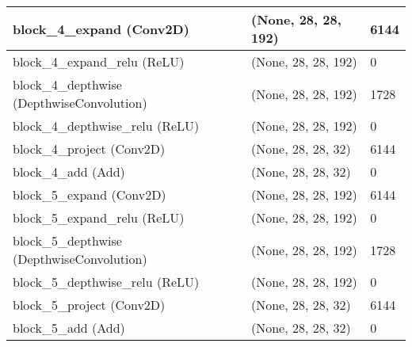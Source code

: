 \documentclass{article}
\begin{document}
\begin{center}
\begin{longtable}[h]{ p{}  p{}  p{}}
block\_4\_expand (Conv2D)                          & (None, 28, 28, 192)  & 6144     \\ \hline
block\_4\_expand\_relu (ReLU)                      & (None, 28, 28, 192)  & 0        \\ \hline
block\_4\_depthwise (DepthwiseConvolution)         & (None, 28, 28, 192)  & 1728     \\ \hline
block\_4\_depthwise\_relu (ReLU)                   & (None, 28, 28, 192)  & 0        \\ \hline
block\_4\_project (Conv2D)                         & (None, 28, 28, 32)   & 6144     \\ \hline
block\_4\_add (Add)                                & (None, 28, 28, 32)   & 0        \\ \hline
block\_5\_expand (Conv2D)                          & (None, 28, 28, 192)  & 6144     \\ \hline
block\_5\_expand\_relu (ReLU)                      & (None, 28, 28, 192)  & 0        \\ \hline
block\_5\_depthwise (DepthwiseConvolution)         & (None, 28, 28, 192)  & 1728     \\ \hline
block\_5\_depthwise\_relu (ReLU)                   & (None, 28, 28, 192)  & 0        \\ \hline
block\_5\_project (Conv2D)                         & (None, 28, 28, 32)   & 6144     \\ \hline
block\_5\_add (Add)                                & (None, 28, 28, 32)   & 0        \\ \hline

\end{longtable}
\end{center}
\end{document}
